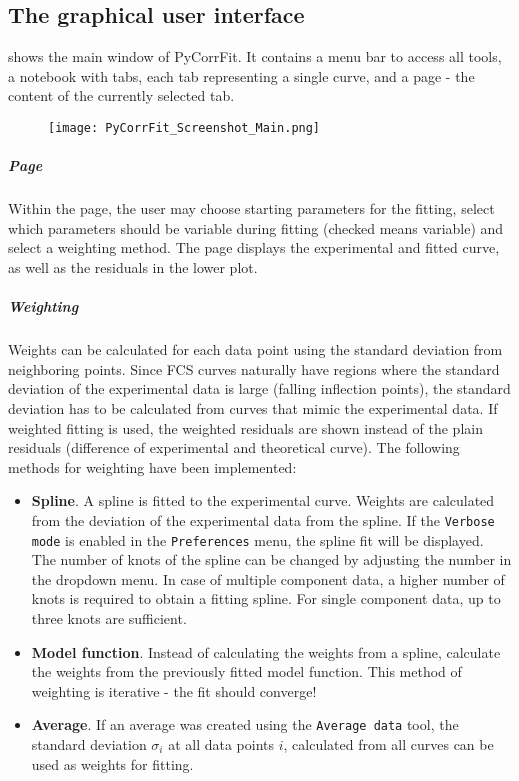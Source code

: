 \subsection{The graphical user interface}
\label{cha_graphint}
\label{sec:PyCorrFitUserInterface}
 shows the main window of PyCorrFit. It contains a menu bar to access all tools, a notebook with tabs, each tab representing a single curve, and a page - the content of the currently selected tab. 
\begin{figure}[h]
\centering
\texttt{[image: PyCorrFit\_Screenshot\_Main.png]}
\end{figure}
\subparagraph*{Page}
Within the page, the user may choose starting parameters for the fitting, select which parameters should be variable during fitting (checked means variable) and select a weighting method. The page displays the experimental and fitted curve, as well as the residuals in the lower plot.

\subparagraph*{Weighting}
Weights can be calculated for each data point using the standard deviation from neighboring points. Since FCS curves naturally have regions where the standard deviation of the experimental data is large (falling inflection points), the standard deviation has to be calculated from curves that mimic the experimental data. If weighted fitting is used, the weighted residuals are shown instead of the plain residuals (difference of experimental and theoretical curve). The following methods for weighting have been implemented:
\begin{itemize}
\item[] \textbf{Spline}. A spline is fitted to the experimental curve. Weights are calculated from the deviation of the experimental data from the spline. If  the \texttt{Verbose mode} is enabled in  the \texttt{Preferences} menu, the spline fit will be displayed. The number of knots of the spline can be changed by adjusting the number in the dropdown menu. In case of multiple component data, a higher number of knots is required to obtain a fitting spline. For single component data, up to three knots are sufficient.
\item[] \textbf{Model function}. Instead of calculating the weights from a spline, calculate the weights from the previously fitted model function. This method of weighting is iterative - the fit should converge!
\item[] \textbf{Average}. If an average was created using the \texttt{Average data} tool, the standard deviation $\sigma_i$ at all data points $i$, calculated from all curves can be used as weights for fitting. 
\end{itemize}

